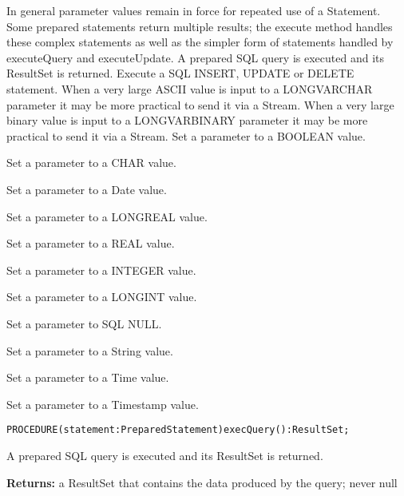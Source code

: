 \begin{description}
 In general parameter values remain in force for repeated use of a Statement. 
 Some prepared statements return multiple results; the execute method handles these complex statements as well as the simpler form of statements handled by executeQuery and executeUpdate. 
 A prepared SQL query is executed and its ResultSet is returned. 
 Execute a SQL INSERT, UPDATE or DELETE statement. 
 When a very large ASCII value is input to a LONGVARCHAR parameter it may be more practical to send it via a Stream. 
 When a very large binary value is input to a LONGVARBINARY parameter it may be more practical to send it via a Stream. 
Set a parameter to a BOOLEAN value. 

Set a parameter to a CHAR value. 

Set a parameter to a Date value. 

Set a parameter to a LONGREAL value. 

Set a parameter to a REAL value. 

Set a parameter to a INTEGER value. 

Set a parameter to a LONGINT value. 

Set a parameter to SQL NULL. 

Set a parameter to a String value. 

Set a parameter to a Time value. 

Set a parameter to a Timestamp value. 

\end{description}



\verb'PROCEDURE(statement:PreparedStatement)execQuery():ResultSet;'

A prepared SQL query is executed and its ResultSet is returned. 


{\bf Returns: } 
a ResultSet that contains the data produced by the query; never null 



